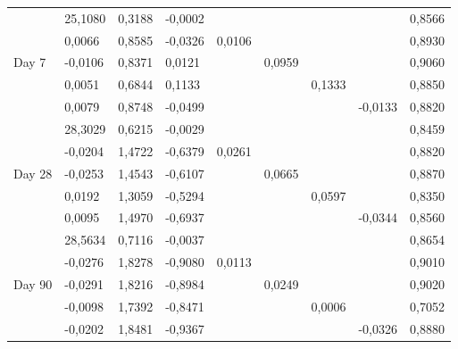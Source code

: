 \documentclass[10pt,conference,compsocconf]{IEEEtran}
\begin{document}
\begin{table}[h]
{\begin{tabular}{l|l|l|l|l|l|l|l|l|}
\multicolumn{1}{|l|}{\multirow{5}{*}{Day   7}}  & 25,1080   & 0,3188    & -0,0002                      &         &        &        &         & 0,8566      \\ \cline{2-9} 
\multicolumn{1}{|l|}{}                          & 0,0066    & 0,8585    & -0,0326                      & 0,0106  &        &        &         & 0,8930      \\ \cline{2-9} 
\multicolumn{1}{|l|}{}                          & -0,0106   & 0,8371    & 0,0121                       &         & 0,0959 &        &         & 0,9060      \\ \cline{2-9} 
\multicolumn{1}{|l|}{}                          & 0,0051    & 0,6844    & 0,1133                       &         &        & 0,1333 &         & 0,8850      \\ \cline{2-9} 
\multicolumn{1}{|l|}{}                          & 0,0079    & 0,8748    & -0,0499                      &         &        &        & -0,0133 & 0,8820      \\ \hline
\multicolumn{1}{|l|}{\multirow{5}{*}{Day   28}} & 28,3029   & 0,6215    & -0,0029                      &         &        &        &         & 0,8459      \\ \cline{2-9} 
\multicolumn{1}{|l|}{}                          & -0,0204   & 1,4722    & -0,6379                      & 0,0261  &        &        &         & 0,8820      \\ \cline{2-9} 
\multicolumn{1}{|l|}{}                          & -0,0253   & 1,4543    & -0,6107                      &         & 0,0665 &        &         & 0,8870      \\ \cline{2-9} 
\multicolumn{1}{|l|}{}                          & 0,0192    & 1,3059    & -0,5294                      &         &        & 0,0597 &         & 0,8350      \\ \cline{2-9} 
\multicolumn{1}{|l|}{}                          & 0,0095    & 1,4970    & -0,6937                      &         &        &        & -0,0344 & 0,8560      \\ \hline
\multicolumn{1}{|l|}{\multirow{5}{*}{Day   90}} & 28,5634   & 0,7116    & -0,0037                      &         &        &        &         & 0,8654      \\ \cline{2-9} 
\multicolumn{1}{|l|}{}                          & -0,0276   & 1,8278    & -0,9080                      & 0,0113  &        &        &         & 0,9010      \\ \cline{2-9} 
\multicolumn{1}{|l|}{}                          & -0,0291   & 1,8216    & -0,8984                      &         & 0,0249 &        &         & 0,9020      \\ \cline{2-9} 
\multicolumn{1}{|l|}{}                          & -0,0098   & 1,7392    & -0,8471                      &         &        & 0,0006 &         & 0,7052      \\ \cline{2-9} 
\multicolumn{1}{|l|}{}                          & -0,0202   & 1,8481    & -0,9367                      &         &        &        & -0,0326 & 0,8880      \\ \hline
\end{tabular}%
}
\end{table}
\end{document}
